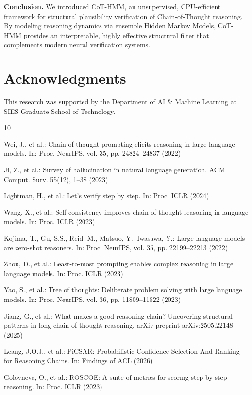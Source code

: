 \documentclass[runningheads]{llncs}
\begin{document}
\textbf{Conclusion.} We introduced CoT-HMM, an unsupervised, CPU-efficient framework for structural plausibility verification of Chain-of-Thought reasoning. By modeling reasoning dynamics via ensemble Hidden Markov Models, CoT-HMM provides an interpretable, highly effective structural filter that complements modern neural verification systems.

\section*{Acknowledgments}
This research was supported by the Department of AI \& Machine Learning at SIES Graduate School of Technology.


\begin{thebibliography}{10}

Wei, J., et al.: Chain-of-thought prompting elicits reasoning in large language models. In: Proc. NeurIPS, vol. 35, pp. 24824--24837 (2022)

Ji, Z., et al.: Survey of hallucination in natural language generation. ACM Comput. Surv. 55(12), 1--38 (2023)

Lightman, H., et al.: Let's verify step by step. In: Proc. ICLR (2024)

Wang, X., et al.: Self-consistency improves chain of thought reasoning in language models. In: Proc. ICLR (2023)

Kojima, T., Gu, S.S., Reid, M., Matsuo, Y., Iwasawa, Y.: Large language models are zero-shot reasoners. In: Proc. NeurIPS, vol. 35, pp. 22199--22213 (2022)

Zhou, D., et al.: Least-to-most prompting enables complex reasoning in large language models. In: Proc. ICLR (2023)

Yao, S., et al.: Tree of thoughts: Deliberate problem solving with large language models. In: Proc. NeurIPS, vol. 36, pp. 11809--11822 (2023)

Jiang, G., et al.: What makes a good reasoning chain? Uncovering structural patterns in long chain-of-thought reasoning. arXiv preprint arXiv:2505.22148 (2025)

Leang, J.O.J., et al.: PiCSAR: Probabilistic Confidence Selection And Ranking for Reasoning Chains. In: Findings of ACL (2026)

Golovneva, O., et al.: ROSCOE: A suite of metrics for scoring step-by-step reasoning. In: Proc. ICLR (2023)


\end{thebibliography}
\end{document}
